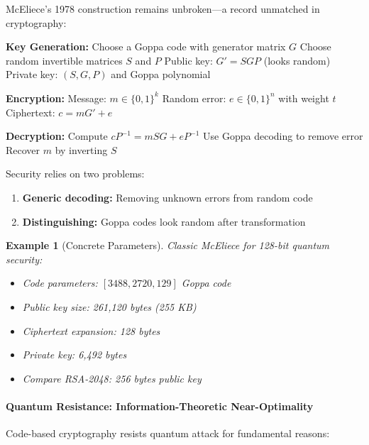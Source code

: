 \documentclass[11pt,a4paper]{article}
\newtheorem{example}{Example}
\begin{document}
McEliece's 1978 construction remains unbroken—a record unmatched in cryptography:

\begin{algorithm}
\caption{McEliece Encryption (Simplified)}
\begin{algorithmic}[1]
\State \textbf{Key Generation:}
\State \quad Choose a Goppa code with generator matrix $G$
\State \quad Choose random invertible matrices $S$ and $P$
\State \quad Public key: $G' = SGP$ (looks random)
\State \quad Private key: $(S, G, P)$ and Goppa polynomial

\State \textbf{Encryption:}
\State \quad Message: $m \in \{0,1\}^k$
\State \quad Random error: $e \in \{0,1\}^n$ with weight $t$
\State \quad Ciphertext: $c = mG' + e$

\State \textbf{Decryption:}
\State \quad Compute $cP^{-1} = mSG + eP^{-1}$
\State \quad Use Goppa decoding to remove error
\State \quad Recover $m$ by inverting $S$
\end{algorithmic}
\end{algorithm}

Security relies on two problems:
\begin{enumerate}
    \item \textbf{Generic decoding:} Removing unknown errors from random code
    \item \textbf{Distinguishing:} Goppa codes look random after transformation
\end{enumerate}

\begin{example}[Concrete Parameters]
Classic McEliece for 128-bit quantum security:
\begin{itemize}
    \item Code parameters: $[3488, 2720, 129]$ Goppa code
    \item Public key size: 261,120 bytes (255 KB)
    \item Ciphertext expansion: 128 bytes
    \item Private key: 6,492 bytes
    \item Compare RSA-2048: 256 bytes public key
\end{itemize}
\end{example}

\paragraph{Quantum Resistance: Information-Theoretic Near-Optimality}

Code-based cryptography resists quantum attack for fundamental reasons:
\end{document}
